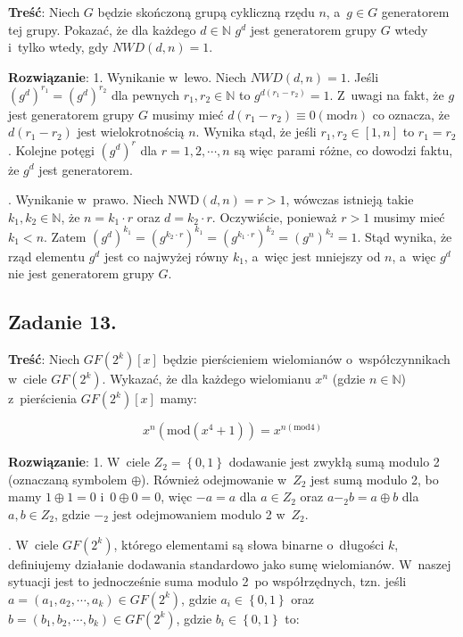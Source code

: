 \documentclass[a4paper,10pt, twocolumn]{article}
\begin{document}
\textbf{Treść}: Niech $G$ będzie skończoną grupą cykliczną rzędu $n$, a~$g \in G$ generatorem tej grupy. Pokazać, że dla każdego $d \in \mathbb{N}$ $g^{d}$ jest generatorem grupy $G$ wtedy i~tylko wtedy, gdy $NWD(d,n) = 1$.

\textbf{Rozwiązanie}: 1. Wynikanie w~lewo. Niech $NWD(d,n) = 1$. Jeśli $(g^{d})^{r_{1}} = (g^{d})^{r_{2}}$ dla pewnych $r_{1}, r_{2} \in \mathbb{N}$ to $g^{d(r_{1} - r_{2})} = 1$. Z~uwagi na fakt, że $g$ jest generatorem grupy $G$ musimy mieć $d(r_{1} - r_{2}) \equiv 0 (\text{mod}n)$ co oznacza, że $d(r_{1} - r_{2})$ jest wielokrotnością $n$. Wynika stąd, że jeśli $r_{1}, r_{2} \in [1, n]$ to $r_{1} = r_{2}$. Kolejne potęgi $(g^{d})^{r}$ dla $r = 1, 2, \cdots, n$ są więc parami różne, co dowodzi faktu, że $g^{d}$ jest generatorem. 

. Wynikanie w~prawo. Niech $\text{NWD}(d,n) = r > 1$, wówczas istnieją takie $k_{1}, k_{2} \in \mathbb{N}$, że $n = k_{1} \cdot r$ oraz $d = k_{2} \cdot r$. Oczywiście, ponieważ $r > 1$ musimy mieć $k_{1} < n$. Zatem $(g^{d})^{k_{1}} = (g^{k_{2} \cdot r})^{k_{1}} = (g^{k_{1} \cdot r})^{k_{2}} = (g^{n})^{k_{2}} = 1$. Stąd wynika, że rząd elementu $g^{d}$ jest co najwyżej równy $k_{1}$, a~więc jest mniejszy od $n$, a~więc $g^{d}$ nie jest generatorem grupy $G$.

\subsection{Zadanie 13.}

\textbf{Treść}: Niech $GF(2^{k})[x]$ będzie pierścieniem wielomianów o~współczynnikach w~ciele $GF(2^{k})$. Wykazać, że dla każdego wielomianu $x^{n}$ (gdzie $n \in \mathbb{N}$) z~pierścienia $GF(2^{k})[x]$ mamy:

\begin{equation*}
	x^{n}(\text{mod}(x^{4} + 1)) = x^{n(\text{mod} 4)}
\end{equation*}

\textbf{Rozwiązanie}: 1. W~ciele $Z_{2} = \left\{0,1\right\}$ dodawanie jest zwykłą sumą modulo 2 (oznaczaną symbolem $\oplus$). Również odejmowanie w~$Z_{2}$ jest sumą modulo 2, bo mamy $1 \oplus 1 = 0$ i~$0 \oplus 0 = 0$, więc $-a = a$ dla $a \in Z_{2}$ oraz $a -_{2} b = a \oplus b$ dla $a, b \in Z_{2}$, gdzie $-_{2}$ jest odejmowaniem modulo 2 w~$Z_{2}$.

. W~ciele $GF(2^{k})$, którego elementami są słowa binarne o~długości $k$, definiujemy działanie dodawania standardowo jako sumę wielomianów. W~naszej sytuacji jest to jednocześnie suma modulo 2~po współrzędnych, tzn. jeśli $a = (a_{1}, a_{2}, \cdots, a_{k}) \in GF(2^{k})$, gdzie $a_{i} \in \left\{0,1\right\}$ oraz $b = (b_{1}, b_{2}, \cdots, b_{k}) \in GF(2^{k})$, gdzie $b_{i} \in \left\{0,1\right\}$ to:
\end{document}
